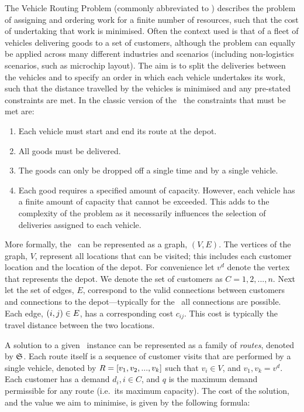 The Vehicle Routing Problem (commonly abbreviated to \VRP) describes the problem of assigning and ordering work for a finite number of resources, such that the cost of undertaking that work is minimised. Often the context used is that of a fleet of vehicles delivering goods to a set of customers, although the problem can equally be applied across many different industries and scenarios (including non-logistics scenarios, such as microchip layout). The aim is to split the deliveries between the vehicles and to specify an order in which each vehicle undertakes its work, such that the distance travelled by the vehicles is minimised and any pre-stated constraints are met. In the classic version of the \VRP\ the constraints that must be met are: 

\begin{enumerate}
   \item Each vehicle must start and end its route at the depot.
   \item All goods must be delivered.
   \item The goods can only be dropped off a single time and by a single vehicle.
   \item Each good requires a specified amount of capacity. However, each vehicle has a finite amount of capacity that cannot be exceeded. This adds to the complexity of the problem as it necessarily influences the selection of deliveries assigned to each vehicle.
\end{enumerate}


More formally, the \VRP\ can be represented as a graph, $(V,E)$. The vertices of the graph, $V$, represent all locations that can be visited; this includes each customer location and the location of the depot. For convenience let $v^d$ denote the vertex that represents the depot. We denote the set of customers as $C = 1,2,...,n$. Next let the set of edges, $E$, correspond to the valid connections between customers and connections to the depot---typically for the \VRP\ all connections are possible. Each edge, $(i,j) \in E$, has a corresponding cost $c_{ij}$. This cost is typically the travel distance between the two locations.

A solution to a given \VRP\ instance can be represented as a family of \emph{routes}, denoted by $\mathfrak{S}$. Each route itself is a sequence of customer visits that are performed by a single vehicle, denoted by $R = [v_1, v_2,..., v_k]$ such that $v_i \in V$, and $v_1, v_k = v^d$. Each customer has a demand $d_i, i \in C$, and $q$ is the maximum demand permissible for any route (i.e.~its maximum capacity). The cost of the solution, and the value we aim to minimise, is given by the following formula:

